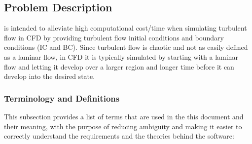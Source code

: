 \documentclass[12pt]{article}
\begin{document}
\subsection{Problem Description} \label{Sec_pd}

\progname{} is intended to alleviate high computational cost/time when simulating turbulent flow in CFD by providing turbulent flow initial conditions and boundary conditions (IC and BC). Since turbulent flow is chaotic and not as easily defined as a laminar flow, in CFD it is typically simulated by starting with a laminar flow and letting it develop over a larger region and longer time before it can develop into the desired state.

\subsubsection{Terminology and  Definitions} \label{sec_termDef}


This subsection provides a list of terms that are used in the this document and their meaning, with the purpose of reducing ambiguity and making it easier to correctly understand the requirements and the theories behind the software:
\end{document}

